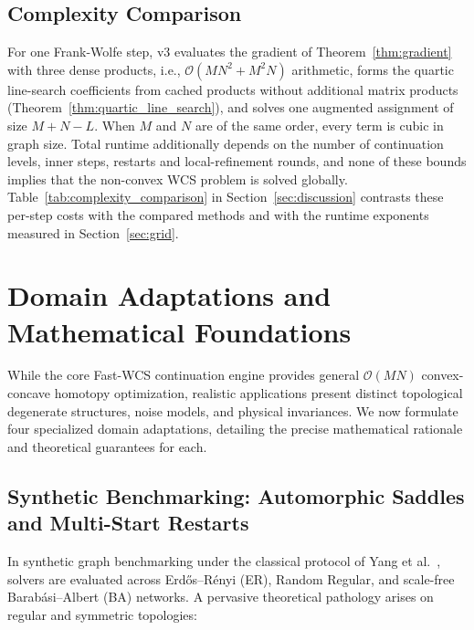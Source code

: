 \documentclass[conference]{IEEEtran}
\begin{document}
\subsection{Complexity Comparison}
\label{subsec:complexity}

For one Frank-Wolfe step, v3 evaluates the gradient of Theorem~\ref{thm:gradient} with three dense products, i.e., $\mathcal{O}(MN^2+M^2N)$ arithmetic, forms the quartic line-search coefficients from cached products without additional matrix products (Theorem~\ref{thm:quartic_line_search}), and solves one augmented assignment of size $M+N-L$. When $M$ and $N$ are of the same order, every term is cubic in graph size. Total runtime additionally depends on the number of continuation levels, inner steps, restarts and local-refinement rounds, and none of these bounds implies that the non-convex WCS problem is solved globally. Table~\ref{tab:complexity_comparison} in Section~\ref{sec:discussion} contrasts these per-step costs with the compared methods and with the runtime exponents measured in Section~\ref{sec:grid}.



\section{Domain Adaptations and Mathematical Foundations}
\label{sec:domains}

While the core Fast-WCS continuation engine provides general $\mathcal{O}(MN)$ convex-concave homotopy optimization, realistic applications present distinct topological degenerate structures, noise models, and physical invariances. We now formulate four specialized domain adaptations, detailing the precise mathematical rationale and theoretical guarantees for each.

\subsection{Synthetic Benchmarking: Automorphic Saddles and Multi-Start Restarts}
\label{subsec:domain_synthetic}

In synthetic graph benchmarking under the classical protocol of Yang et al.~\cite{yang2018algorithm}, solvers are evaluated across Erd\H{o}s--R\'enyi (ER), Random Regular, and scale-free Barab\'asi--Albert (BA) networks. A pervasive theoretical pathology arises on regular and symmetric topologies:
\end{document}
